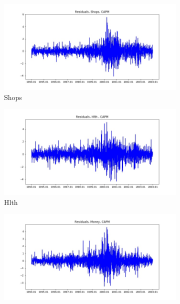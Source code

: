 \documentclass{article}
\begin{document}
\begin{figure}
  
  \begin{subfigure}[b]{0.5\textwidth}
    \centering
    \includegraphics[width=\textwidth]{Shops/resid_ts_CAPM.jpg}
    \caption{Shops}
    \label{fig:2}
  \end{subfigure}
  \begin{subfigure}[b]{0.5\textwidth}
    \centering
    \includegraphics[width=\textwidth]{Hlth/resid_ts_CAPM.jpg}
    \caption{Hlth}
    \label{fig:2}
  \end{subfigure}
  \begin{subfigure}[b]{0.5\textwidth}
    \centering
    \includegraphics[width=\textwidth]{Money/resid_ts_CAPM.jpg}

\end{subfigure}
\end{figure}
\end{document}
